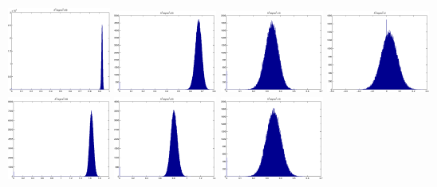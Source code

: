 \documentclass[12pt]{article}
\begin{document}
\begin{figure}
\centering
\includegraphics[width = 0.24\textwidth]{figures/empriLL50.eps} 
\includegraphics[width = 0.24\textwidth]{figures/empriLL20.eps} 
\includegraphics[width = 0.24\textwidth]{figures/empriLL10.eps} 
\includegraphics[width = 0.24\textwidth]{figures/empriLL2.eps} \\
\includegraphics[width = 0.24\textwidth]{figures/empriLL50z.eps} 
\includegraphics[width = 0.24\textwidth]{figures/empriLL20z.eps} 
\includegraphics[width = 0.24\textwidth]{figures/empriLL10z.eps} 

\end{figure}
\end{document}
